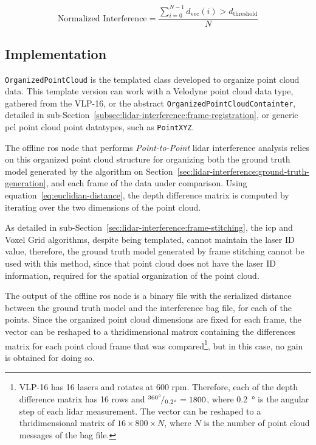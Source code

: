\begin{equation}
	\label{eq:normalized-interference-depth}
	\displaystyle
	\text{Normalized Interference} = \frac{\sum\limits^{N-1}_{i = 0} d_{\text{vec}}(i)
	> d_\text{threshold}}{N}
\end{equation}

\subsection{Implementation}
\texttt{OrganizedPointCloud} is the templated class developed to organize point cloud data. This template version can work with a Velodyne point cloud data type, gathered from the VLP-16, or the abstract \texttt{OrganizedPointCloudContainter}, detailed in sub-Section~\ref{subsec:lidar-interference:frame-registration}, or generic \ac{pcl} point cloud point datatypes, such as \texttt{PointXYZ}.

The offline \ac{ros} node that performs \textit{Point-to-Point} \ac{lidar} interference analysis relies on this organized point cloud structure for organizing both the ground truth model generated by the algorithm on Section~\ref{sec:lidar-interference:ground-truth-generation}, and each frame of the data under comparison. Using equation~\ref{eq:euclidian-distance}, the depth difference matrix is computed by iterating over the two dimensions of the point cloud. 

As detailed in sub-Section~\ref{sec:lidar-interference:frame-stitching}, the \ac{icp} and Voxel Grid algorithms, despite being templated, cannot maintain the \ac{laser} ID value, therefore, the ground truth model generated by frame stitching cannot be used with this method, since that point cloud does not have the \ac{laser} ID information, required for the spatial organization of the point cloud.

The output of the offline \ac{ros} node is a binary file with the serialized distance between the ground truth model and the interference bag file, for each of the points. Since the organized point cloud dimensions are fixed for each frame, the vector can be reshaped to a thridimensional matrox containing the differences matrix for each point cloud frame that was compared\footnote{VLP-16 has 16 lasers and rotates at 600 \ac{rpm}. Therefore, each of the depth difference matrix has 16 rows and ${}^{\SI{360}{\degree}}\!/_{\SI{0.2}{\degree}} = 1800$, where \SI{0.2}{\degree} is the angular step of each \ac{lidar} measurement. The vector can be reshaped to a thridimensional matrix of $16\times 800\times N$, where $N$ is the number of point cloud messages of the bag file.}, but in this case, no gain is obtained for doing so.

